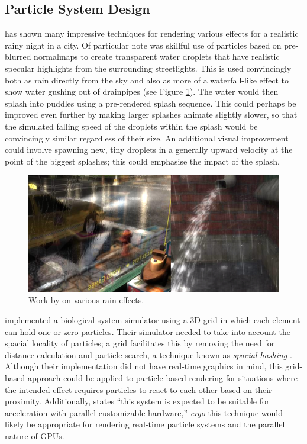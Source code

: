 \documentclass[11pt, a4paper, twocolumn]{article}
\begin{document}
\subsection{Particle System Design}

\citet{Tatarchuk2006} has shown many impressive techniques for rendering various effects for a realistic rainy night in a city. Of particular note was skillful use of particles based on pre-blurred normalmaps to create transparent water droplets that have realistic specular highlights from the surrounding streetlights. This is used convincingly both as rain directly from the sky and also as more of a waterfall-like effect to show water gushing out of drainpipes (see Figure \ref{fig:tatarchuk}). The water would then splash into puddles using a pre-rendered splash sequence. This could perhaps be improved even further by making larger splashes animate slightly slower, so that the simulated falling speed of the droplets within the splash would be convincingly similar regardless of their size. An additional visual improvement could involve spawning new, tiny droplets in a generally upward velocity at the point of the biggest splashes; this could emphasise the impact of the splash.

\begin{figure}[h]
\includegraphics[width=\linewidth]{tatarchuk}
\caption{Work by \citet{Tatarchuk2006} on various rain effects.}
\label{fig:tatarchuk}
\end{figure}

\citet{Boulianne2007} implemented a biological system simulator using a 3D grid in which each element can hold one or zero particles. Their simulator needed to take into account the spacial locality of particles; a grid facilitates this by removing the need for distance calculation and particle search, a technique known as \emph{spacial hashing} \citep{Lefebvre2006}. Although their implementation did not have real-time graphics in mind, this grid-based approach could be applied to particle-based rendering for situations where the intended effect requires particles to react to each other based on their proximity. Additionally, \citet{Boulianne2007} states ``this system is expected to be suitable for acceleration with parallel customizable hardware,'' \emph{ergo} this technique would likely be appropriate for rendering real-time particle systems and the parallel nature of GPUs.
\end{document}
